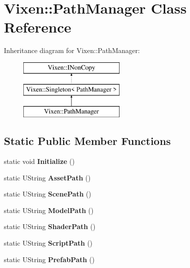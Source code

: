 \hypertarget{class_vixen_1_1_path_manager}{}\section{Vixen\+:\+:Path\+Manager Class Reference}
\label{class_vixen_1_1_path_manager}
Inheritance diagram for Vixen\+:\+:Path\+Manager\+:\begin{figure}[H]
\begin{center}
\leavevmode
\includegraphics[height=3.000000cm]{class_vixen_1_1_path_manager}
\end{center}
\end{figure}
\subsection*{Static Public Member Functions}
\begin{DoxyCompactItemize}
\item 
\hypertarget{class_vixen_1_1_path_manager_a178ffa89f1ac1f6f5cd03f17fefea8a3}{}static void {\bfseries Initialize} ()\label{class_vixen_1_1_path_manager_a178ffa89f1ac1f6f5cd03f17fefea8a3}

\item 
\hypertarget{class_vixen_1_1_path_manager_ab4f929d54a622d0c7dfa520db9d5b2dd}{}static U\+String {\bfseries Asset\+Path} ()\label{class_vixen_1_1_path_manager_ab4f929d54a622d0c7dfa520db9d5b2dd}

\item 
\hypertarget{class_vixen_1_1_path_manager_ac860e8e2d7cea244dffcae9d6ec3ef8c}{}static U\+String {\bfseries Scene\+Path} ()\label{class_vixen_1_1_path_manager_ac860e8e2d7cea244dffcae9d6ec3ef8c}

\item 
\hypertarget{class_vixen_1_1_path_manager_a0689dea04746aeb51d25562ac32a992a}{}static U\+String {\bfseries Model\+Path} ()\label{class_vixen_1_1_path_manager_a0689dea04746aeb51d25562ac32a992a}

\item 
\hypertarget{class_vixen_1_1_path_manager_a59b6ef4d45c6355616783e8574fce25d}{}static U\+String {\bfseries Shader\+Path} ()\label{class_vixen_1_1_path_manager_a59b6ef4d45c6355616783e8574fce25d}

\item 
\hypertarget{class_vixen_1_1_path_manager_a9a09a5efd7670a09bad8c07e1be4a2b4}{}static U\+String {\bfseries Script\+Path} ()\label{class_vixen_1_1_path_manager_a9a09a5efd7670a09bad8c07e1be4a2b4}

\item 
\hypertarget{class_vixen_1_1_path_manager_a9a8b2608f60aca17401b3470b893294a}{}static U\+String {\bfseries Prefab\+Path} ()\label{class_vixen_1_1_path_manager_a9a8b2608f60aca17401b3470b893294a}

\end{DoxyCompactItemize}


